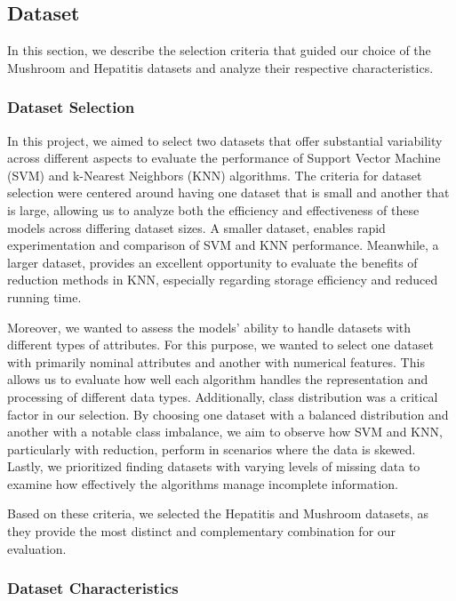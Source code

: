 \subsection{Dataset}
\label{subsec:dataset}

In this section, we describe the selection criteria that guided our choice of the Mushroom and Hepatitis datasets and analyze their respective characteristics.

\subsubsection{Dataset Selection}
In this project, we aimed to select two datasets that offer substantial variability across different aspects to evaluate the performance of Support Vector Machine (SVM) and k-Nearest Neighbors (KNN) algorithms.
The criteria for dataset selection were centered around having one dataset that is small and another that is large, allowing us to analyze both the efficiency and effectiveness of these models across differing dataset sizes.
A smaller dataset, enables rapid experimentation and comparison of SVM and KNN performance.
Meanwhile, a larger dataset, provides an excellent opportunity to evaluate the benefits of reduction methods in KNN, especially regarding storage efficiency and reduced running time.

Moreover, we wanted to assess the models' ability to handle datasets with different types of attributes.
For this purpose, we wanted to select one dataset with primarily nominal attributes and another with numerical features.
This allows us to evaluate how well each algorithm handles the representation and processing of different data types.
Additionally, class distribution was a critical factor in our selection. By choosing one dataset with a balanced distribution and another with a notable class imbalance, we aim to observe how SVM and KNN, particularly with reduction, perform in scenarios where the data is skewed.
Lastly, we prioritized finding datasets with varying levels of missing data to examine how effectively the algorithms manage incomplete information.

Based on these criteria, we selected the Hepatitis and Mushroom datasets, as they provide the most distinct and complementary combination for our evaluation.

\subsubsection{Dataset Characteristics}

